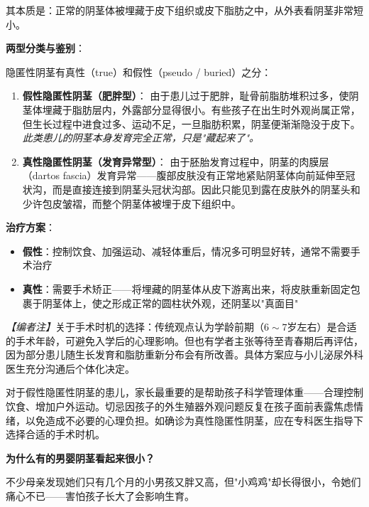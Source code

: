 其本质是：正常的阴茎体被埋藏于皮下组织或皮下脂肪之中，从外表看阴茎非常短小。

\vspace{0.5em}
\noindent\textbf{两型分类与鉴别}：

隐匿性阴茎有真性（true）和假性（pseudo / buried）之分：

\begin{enumerate}
	\item \textbf{假性隐匿性阴茎（肥胖型）}：
	由于患儿过于肥胖，耻骨前脂肪堆积过多，使阴茎体埋藏于脂肪层内，外露部分显得很小。有些孩子在出生时外观尚属正常，但生长过程中进食过多、运动不足，一旦脂肪积累，阴茎便渐渐隐没于皮下。\textit{此类患儿的阴茎本身发育完全正常，只是"藏起来了"。}

	\item \textbf{真性隐匿性阴茎（发育异常型）}：
	由于胚胎发育过程中，阴茎的肉膜层（dartos fascia）发育异常——腹部皮肤没有正常地紧贴阴茎体向前延伸至冠状沟，而是直接连接到阴茎头冠状沟部。因此只能见到露在皮肤外的阴茎头和少许包皮皱褶，而整个阴茎体被埋于皮下组织中。
\end{enumerate}

\noindent\textbf{治疗方案}：

\begin{itemize}
	\item \textbf{假性}：控制饮食、加强运动、减轻体重后，情况多可明显好转，通常不需要手术治疗
	\item \textbf{真性}：需要手术矫正——将埋藏的阴茎体从皮下游离出来，将皮肤重新固定包裹于阴茎体上，使之形成正常的圆柱状外观，还阴茎以"真面目"
\end{itemize}

\noindent\textit{【编者注】}关于手术时机的选择：传统观点认为学龄前期（$6\sim7$岁左右）是合适的手术年龄，可避免入学后的心理影响。但也有学者主张等待至青春期后再评估，因为部分患儿随生长发育和脂肪重新分布会有所改善。具体方案应与小儿泌尿外科医生充分沟通后个体化决定。

\begin{tcolorbox}[colback=pink!5!white,colframe=red!50!black,title=贴心小叮咛]
对于假性隐匿性阴茎的患儿，家长最重要的是帮助孩子科学管理体重——合理控制饮食、增加户外运动。切忌因孩子的外生殖器外观问题反复在孩子面前表露焦虑情绪，以免造成不必要的心理负担。如确诊为真性隐匿性阴茎，应在专科医生指导下选择合适的手术时机。
\end{tcolorbox}

\vspace{0.8em}
\noindent\textbf{为什么有的男婴阴茎看起来很小？}

不少母亲发现她们只有几个月的小男孩又胖又高，但"小鸡鸡"却长得很小，令她们痛心不已——害怕孩子长大了会影响生育。

